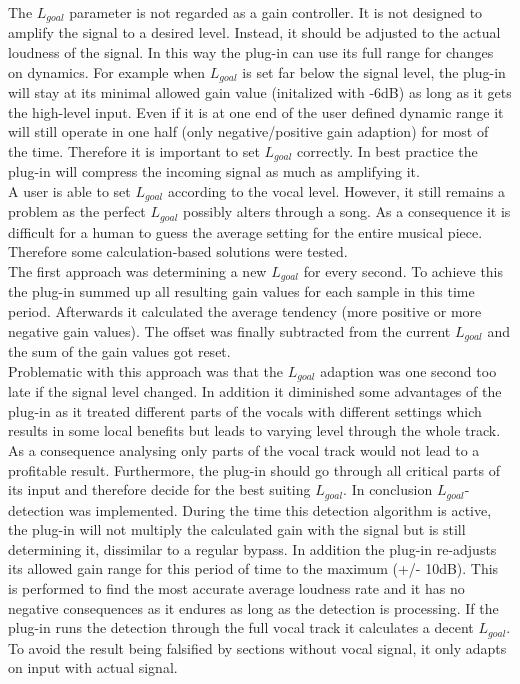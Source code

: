 The $L_{goal}$ parameter is not regarded as a gain controller. It is not designed to amplify the signal to a desired level. Instead, it should be adjusted to the actual loudness of the signal. In this way the plug-in can use its full range for changes on dynamics. For example when $L_{goal}$ is set far below the signal level, the plug-in will stay at its minimal allowed gain value (initalized with -6dB) as long as it gets the high-level input. Even if it is at one end of the user defined dynamic range it will still operate in one half (only negative/positive gain adaption) for most of the time. Therefore it is important to set $L_{goal}$ correctly. In best practice the plug-in will compress the incoming signal as much as amplifying it.\\
A user is able to set $L_{goal}$ according to the vocal level. However, it still remains a problem as the perfect $L_{goal}$ possibly alters through a song. As a consequence it is difficult for a human to guess the average setting for the entire musical piece. Therefore some calculation-based solutions were tested.\\
The first approach was determining a new $L_{goal}$ for every second. To achieve this the plug-in summed up all resulting gain values for each sample in this time period. Afterwards it calculated the average tendency (more positive or more negative gain values). The offset was finally subtracted from the current $L_{goal}$ and the sum of the gain values got reset.\\
Problematic with this approach was that the $L_{goal}$ adaption was one second too late if the signal level changed. In addition it diminished some advantages of the plug-in as it treated different parts of the vocals with different settings which results in some local benefits but leads to varying level through the whole track.\\
As a consequence analysing only parts of the vocal track would not lead to a profitable result. Furthermore, the plug-in should go through all critical parts of its input and therefore decide for the best suiting $L_{goal}$. In conclusion $L_{goal}$-detection was implemented. During the time this detection algorithm is active, the plug-in will not multiply the calculated gain with the signal but is still determining it, dissimilar to a regular bypass. In addition the plug-in re-adjusts its allowed gain range for this period of time to the maximum (+/- 10dB). This is performed to find the most accurate average loudness rate and it has no negative consequences as it endures as long as the detection is processing. If the plug-in runs the detection through the full vocal track it calculates a decent $L_{goal}$. To avoid the result being falsified by sections without vocal signal, it only adapts on input with actual signal.\\
